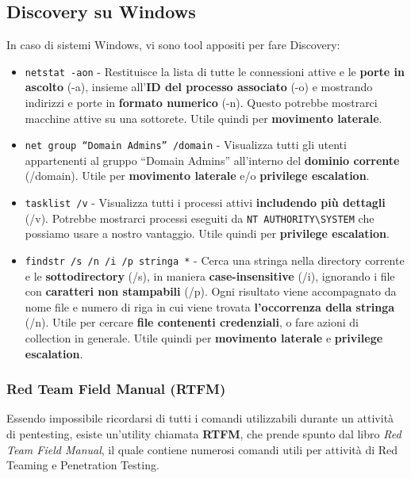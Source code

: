 \documentclass{article}
\begin{document}
\subsection{Discovery su Windows}
In caso di sistemi Windows, vi sono tool appositi per fare Discovery:
\begin{itemize}
	\item \verb|netstat -aon| - Restituisce la lista di tutte le connessioni attive e le \textbf{porte in ascolto} (-a), insieme all’\textbf{ID del processo associato} (-o) e mostrando indirizzi e porte in \textbf{formato numerico} (-n). Questo potrebbe mostrarci macchine attive su una sottorete. Utile quindi per \textbf{movimento laterale}.
	
	\item \verb|net group “Domain Admins” /domain| - Visualizza tutti gli utenti appartenenti al gruppo “Domain Admins” all’interno del \textbf{dominio corrente} (/domain). Utile per \textbf{movimento laterale} e/o \textbf{privilege escalation}.
	
	\item \verb|tasklist /v| - Visualizza tutti i processi attivi \textbf{includendo più dettagli} (/v). Potrebbe mostrarci processi eseguiti da \verb|NT AUTHORITY\SYSTEM| che possiamo usare a nostro vantaggio. Utile quindi per \textbf{privilege escalation}.
	
	\item \verb|findstr /s /n /i /p stringa *| - Cerca una stringa nella directory corrente e le \textbf{sottodirectory} (/s), in maniera
	\textbf{case-insensitive} (/i), ignorando i file con \textbf{caratteri non stampabili} (/p). Ogni risultato viene accompagnato da nome file e numero di riga in cui viene trovata \textbf{l’occorrenza della stringa}
	(/n). Utile per cercare \textbf{file contenenti credenziali}, o fare azioni di collection in generale. Utile quindi per \textbf{movimento laterale} e \textbf{privilege escalation}.
\end{itemize}

\subsubsection{Red Team Field Manual (RTFM)}
Essendo impossibile ricordarsi di tutti i comandi utilizzabili durante un attività di pentesting, esiste un'utility chiamata \textbf{RTFM}, che prende spunto dal libro \textit{Red Team Field Manual}, il quale contiene numerosi comandi utili per attività di Red Teaming e Penetration Testing.
\end{document}
